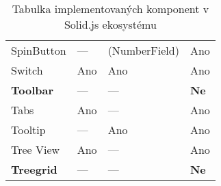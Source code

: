 \begin{table}
\begin{tabularx}{\textwidth}{Y Y Y Y}
        SpinButton            & ---                   & (NumberField)      & Ano                  \\
        Switch                & Ano                   & Ano                & Ano                  \\
        \textbf{Toolbar}      & ---                   & ---                & \textbf{Ne}          \\
        Tabs                  & Ano                   & ---                & Ano                  \\
        Tooltip               & ---                   & Ano                & Ano                  \\
        Tree View             & Ano                   & ---                & Ano                  \\
        \textbf{Treegrid}     & ---                   & ---                & \textbf{Ne}
    \end{tabularx}
    \caption{Tabulka implementovaných komponent v Solid.js ekosystému}
    \label{tab:implemented-components}
\end{table}
